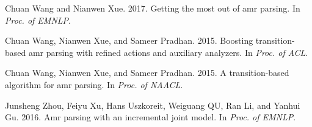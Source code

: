 \documentclass[11pt,a4paper]{article}
\begin{document}
\begin{thebibliography}{30}
	Chuan Wang and Nianwen Xue. 2017.
	\newblock Getting the most out of amr parsing.
	\newblock In \emph{Proc. of EMNLP}.
	
	Chuan Wang, Nianwen Xue, and Sameer Pradhan. 2015{}.
	\newblock Boosting transition-based amr parsing with refined actions and
	auxiliary analyzers.
	\newblock In \emph{Proc. of ACL}.
	
	Chuan Wang, Nianwen Xue, and Sameer Pradhan. 2015{}.
	\newblock A transition-based algorithm for amr parsing.
	\newblock In \emph{Proc. of NAACL}.
	
	Junsheng Zhou, Feiyu Xu, Hans Uszkoreit, Weiguang QU, Ran Li, and Yanhui Gu.
	2016.
	\newblock Amr parsing with an incremental joint model.
	\newblock In \emph{Proc. of EMNLP}.
	
\end{thebibliography}
\end{document}
